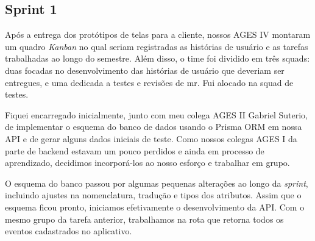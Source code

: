 \subsection{Sprint 1}

Após a entrega dos protótipos de telas para a cliente, nossos AGES IV montaram um quadro \textit{Kanban} no qual seriam registradas as histórias de usuário e as tarefas trabalhadas ao longo do semestre. Além disso, o time foi dividido em três squads: duas focadas no desenvolvimento das histórias de usuário que deveriam ser entregues, e uma dedicada a testes e revisões de \ac{mr}. Fui alocado na squad de testes.

Fiquei encarregado inicialmente, junto com meu colega AGES II Gabriel Suterio, de implementar o esquema do banco de dados usando o Prisma ORM em nossa API e de gerar alguns dados iniciais de teste. Como nossos colegas AGES I da parte de backend estavam um pouco perdidos e ainda em processo de aprendizado, decidimos incorporá-los ao nosso esforço e trabalhar em grupo.

O esquema do banco passou por algumas pequenas alterações ao longo da \textit{sprint}, incluindo ajustes na nomenclatura, tradução e tipos dos atributos. Assim que o esquema ficou pronto, iniciamos efetivamente o desenvolvimento da API. Com o mesmo grupo da tarefa anterior, trabalhamos na rota que retorna todos os eventos cadastrados no aplicativo.
\\
\\
\noindent{}